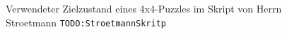 \begin{minipage}{\linewidth}
\begin{minipage}[t]{0.45\linewidth}
\begin{figure}[H]
			\captionsetup{format=plain, indention=0pt}
			\caption{\label{fig:Perm_puzzle_end_stroet}Verwendeter Zielzustand eines 4x4-Puzzles im Skript von Herrn Stroetmann \texttt{TODO:StroetmannSkritp}}
		\end{figure}
	\end{minipage}
\end{minipage}\WNL%
